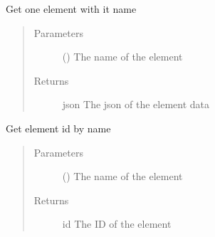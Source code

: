\documentclass[letterpaper,10pt,english]{sphinxmanual}
\begin{document}
\begin{fulllineitems}
\begin{fulllineitems}
\label{\detokenize{index:Api.Api.get_element_by_name}}
\sphinxAtStartPar
Get one element with it name
\begin{quote}\begin{description}
\item[{Parameters}] \leavevmode
\sphinxAtStartPar
{} () \textendash{} The name of the element

\item[{Returns}] \leavevmode
\sphinxAtStartPar
json \textendash{} The json of the element data

\end{description}\end{quote}

\end{fulllineitems}


\begin{fulllineitems}
\label{\detokenize{index:Api.Api.get_element_id_by_name}}
\sphinxAtStartPar
Get element id by name
\begin{quote}\begin{description}
\item[{Parameters}] \leavevmode
\sphinxAtStartPar
{} () \textendash{} The name of the element

\item[{Returns}] \leavevmode
\sphinxAtStartPar
id \textendash{} The ID of the element

\end{description}\end{quote}

\end{fulllineitems}



\end{fulllineitems}
\end{document}
